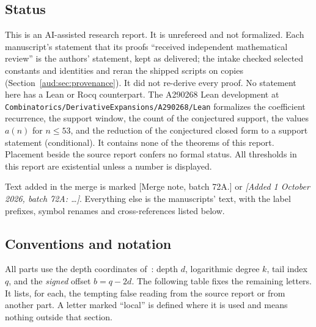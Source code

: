 \documentclass[11pt,a4paper]{article}
\numberwithin{equation}{section}
\begin{document}
\subsection{Status}\label{aud:sec:status}
This is an AI-assisted research report. It is unrefereed and not formalized. Each manuscript's statement that its proofs ``received independent mathematical review'' is the authors' statement, kept as delivered; the intake checked selected constants and identities and reran the shipped scripts on copies (Section~\ref{aud:sec:provenance}). It did not re-derive every proof. No statement here has a Lean or Rocq counterpart. The A290268 Lean development at \nolinkurl{Combinatorics/DerivativeExpansions/A290268/Lean} formalizes the coefficient recurrence, the support window, the count of the conjectured support, the values $a(n)$ for $n\le53$, and the reduction of the conjectured closed form to a support statement (conditional). It contains none of the theorems of this report. Placement beside the source report confers no formal status. All thresholds in this report are existential unless a number is displayed.

Text added in the merge is marked \textsf{[Merge note, batch 72A.]} or \textit{[Added 1 October 2026, batch 72A: \dots]}. Everything else is the manuscripts' text, with the label prefixes, symbol renames and cross-references listed below.

\subsection{Conventions and notation}\label{aud:sec:conventions}
All parts use the depth coordinates of~\cite[Section 3.15]{source}: depth $d$, logarithmic degree $k$, tail index $q$, and the \emph{signed} offset $b=q-2d$. The following table fixes the remaining letters. It lists, for each, the tempting false reading from the source report or from another part. A letter marked ``local'' is defined where it is used and means nothing outside that section.
\end{document}
